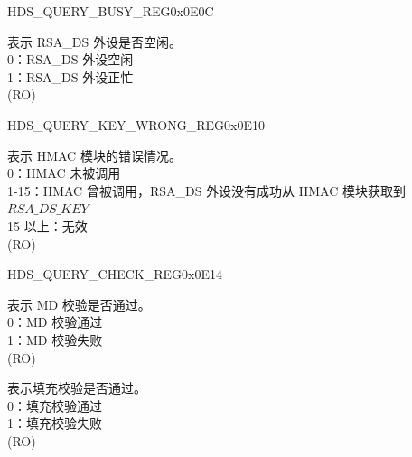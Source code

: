 \begin{register}{H}{DS\_QUERY\_BUSY\_REG}{0x0E0C}\label{regdesc:DSQUERYBUSYREG}
%
%
\regnewline%
\begin{regdesc}\begin{reglist}
\label{fielddesc:DSQUERYBUSY}\item [DS\_QUERY\_BUSY] 表示 RSA\_DS 外设是否空闲。\\
0：RSA\_DS 外设空闲\\
1：RSA\_DS 外设正忙\\
(RO)
\end{reglist}\end{regdesc}
\end{register}


\begin{register}{H}{DS\_QUERY\_KEY\_WRONG\_REG}{0x0E10}\label{regdesc:DSQUERYKEYWRONGREG}
%
%
\regnewline%
\begin{regdesc}\begin{reglist}
\label{fielddesc:DSQUERYKEYWRONG}\item [DS\_QUERY\_KEY\_WRONG] 表示 HMAC 模块的错误情况。\\
0：HMAC 未被调用\\
1-15：HMAC 曾被调用，RSA\_DS 外设没有成功从 HMAC 模块获取到 \begin{math}RSA\_DS\_KEY\end{math}\\
15 以上：无效\\
(RO)
\end{reglist}\end{regdesc}
\end{register}


\begin{register}{H}{DS\_QUERY\_CHECK\_REG}{0x0E14}\label{regdesc:DSQUERYCHECKREG}
%
%
%
\regnewline%
\begin{regdesc}\begin{reglist}
\label{fielddesc:DSMDERROR}\item [DS\_MD\_ERROR] 表示 MD 校验是否通过。\\
0：MD 校验通过\\
1：MD 校验失败\\
(RO)
\label{fielddesc:DSPADDINGBAD}\item [DS\_PADDING\_BAD] 表示填充校验是否通过。\\
0：填充校验通过\\
1：填充校验失败\\
(RO)
\end{reglist}\end{regdesc}
\end{register}


